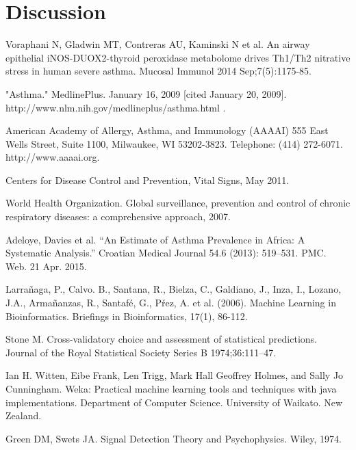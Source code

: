 \documentclass[conference,a4paper]{IEEEtran}
\begin{document}
\section{Discussion}



\begin{thebibliography}{1}
	
	 Voraphani N, Gladwin MT, Contreras AU, Kaminski N et al. An airway epithelial iNOS-DUOX2-thyroid peroxidase metabolome drives Th1/Th2 nitrative stress in human severe asthma. Mucosal Immunol 2014 Sep;7(5):1175-85.
	
	 "Asthma." MedlinePlus. January 16, 2009 [cited January 20, 2009]. http://www.nlm.nih.gov/medlineplus/asthma.html .
	
	 American Academy of Allergy, Asthma, and Immunology (AAAAI) 555 East Wells Street, Suite 1100, Milwaukee, WI 53202-3823. Telephone: (414) 272-6071. http://www.aaaai.org.
	
	 Centers for Disease Control and Prevention, Vital Signs, May 2011.
	
	 World Health Organization. Global surveillance, prevention and control of chronic respiratory diseases: a comprehensive approach, 2007.
	
	 Adeloye, Davies et al. “An Estimate of Asthma Prevalence in Africa: A Systematic Analysis.” Croatian Medical Journal 54.6 (2013): 519–531. PMC. Web. 21 Apr. 2015.
	
	Larra\~naga, P., Calvo. B., Santana, R., Bielza, C., Galdiano, J., Inza, I., Lozano, J.A., Arma\~nanzas, R., Santaf\'e, G., P\'rez, A. et al. (2006). Machine Learning in Bioinformatics. Briefings in Bioinformatics, 17(1), 86-112.
	
	 Stone M. Cross-validatory choice and assessment of statistical predictions. Journal of the Royal Statistical Society Series B 1974;36:111–47.
	
	 Ian H. Witten, Eibe Frank, Len Trigg, Mark Hall Geoffrey Holmes, and Sally Jo Cunningham. Weka: Practical machine learning tools and techniques with java implementations. Department of Computer Science. University of Waikato. New Zealand.
	
	 Green DM, Swets JA. Signal Detection Theory and Psychophysics. Wiley, 1974.
	
	
\end{thebibliography}
\end{document}
